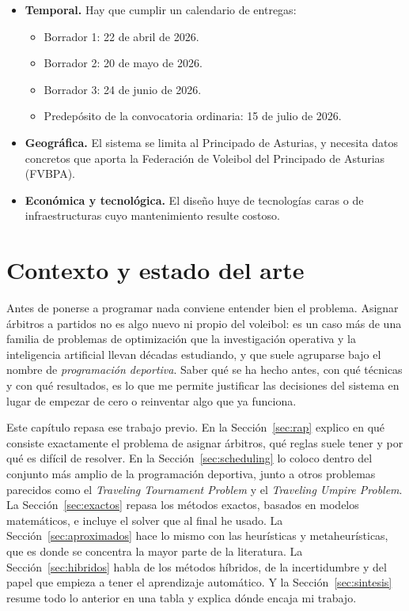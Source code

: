 \documentclass[11pt,a4paper,spanish]{book}
\numberwithin{equation}{chapter}
\numberwithin{figure}{chapter}
\numberwithin{table}{chapter}
\begin{document}
\begin{itemize}
\item {\bf Temporal.} Hay que cumplir un calendario de entregas:
    \begin{itemize}
    \item Borrador 1: 22 de abril de 2026.
    \item Borrador 2: 20 de mayo de 2026.
    \item Borrador 3: 24 de junio de 2026.
    \item Predepósito de la convocatoria ordinaria: 15 de julio de 2026.
    \end{itemize}
\item {\bf Geográfica.} El sistema se limita al Principado de Asturias, y necesita datos concretos que aporta la Federación de Voleibol del Principado de Asturias (FVBPA).
\item {\bf Económica y tecnológica.} El diseño huye de tecnologías caras o de infraestructuras cuyo mantenimiento resulte costoso.
\end{itemize}


\chapter{Contexto y estado del arte}

Antes de ponerse a programar nada conviene entender bien el problema. Asignar árbitros a partidos no es algo nuevo ni propio del voleibol: es un caso más de una familia de problemas de optimización que la investigación operativa y la inteligencia artificial llevan décadas estudiando, y que suele agruparse bajo el nombre de \emph{programación deportiva}. Saber qué se ha hecho antes, con qué técnicas y con qué resultados, es lo que me permite justificar las decisiones del sistema en lugar de empezar de cero o reinventar algo que ya funciona.

Este capítulo repasa ese trabajo previo. En la Sección~\ref{sec:rap} explico en qué consiste exactamente el problema de asignar árbitros, qué reglas suele tener y por qué es difícil de resolver. En la Sección~\ref{sec:scheduling} lo coloco dentro del conjunto más amplio de la programación deportiva, junto a otros problemas parecidos como el \emph{Traveling Tournament Problem} y el \emph{Traveling Umpire Problem}. La Sección~\ref{sec:exactos} repasa los métodos exactos, basados en modelos matemáticos, e incluye el solver que al final he usado. La Sección~\ref{sec:aproximados} hace lo mismo con las heurísticas y metaheurísticas, que es donde se concentra la mayor parte de la literatura. La Sección~\ref{sec:hibridos} habla de los métodos híbridos, de la incertidumbre y del papel que empieza a tener el aprendizaje automático. Y la Sección~\ref{sec:sintesis} resume todo lo anterior en una tabla y explica dónde encaja mi trabajo.
\end{document}
